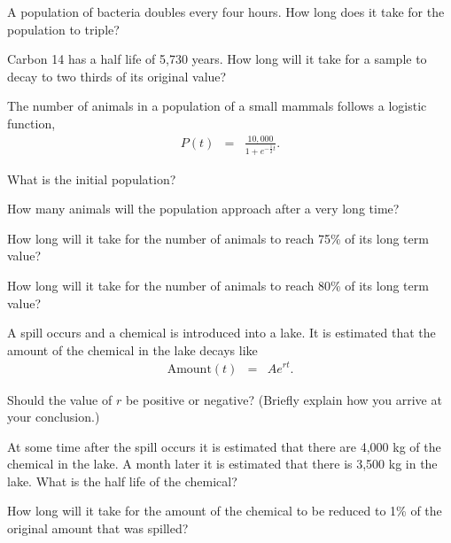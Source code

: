 \begin{problem}
\item A population of bacteria doubles every four hours. How long does
  it take for the population to triple?
  \vfill
\item Carbon 14 has a half life of 5,730 years. How long will it take
  for a sample to decay to two thirds of its original value?
  \vfill
\clearpage

\item The number of animals in a population of a small mammals follows
  a logistic function,
  \begin{eqnarray*}
    P(t) & = & \frac{10,000}{1+e^{-\frac{1}{2}t}}.
  \end{eqnarray*}
  \begin{subproblem}
  \item What is the initial population?
    \vspace{4em}
  \item How many animals will the population approach after a very
    long time?
    \vspace{4em}
  \item How long will it take for the number of animals to reach 75\%
    of its long term value?
    \vfill
  \item How long will it take for the number of animals to reach 80\%
    of its long term value?
    \vfill
  \end{subproblem}

\clearpage

\item A spill occurs and a chemical is introduced into a lake. It is
  estimated that the amount of the chemical in the lake decays like
  \begin{eqnarray*}
    \mathrm{Amount}(t) & = & A e^{rt}.
  \end{eqnarray*}
  \begin{subproblem}
  \item Should the value of $r$ be positive or negative? (Briefly
    explain how you arrive at your conclusion.)
    \vspace{5em}

  \item At some time after the spill occurs it is estimated that there
    are 4,000 kg of the chemical in the lake. A month later it is
    estimated that there is 3,500 kg in the lake. What is the half
    life of the chemical?  \vfill

  \item How long will it take for the amount of the chemical to be
    reduced to 1\% of the original amount that was spilled?
    \vfill
  \end{subproblem}

\end{problem}

